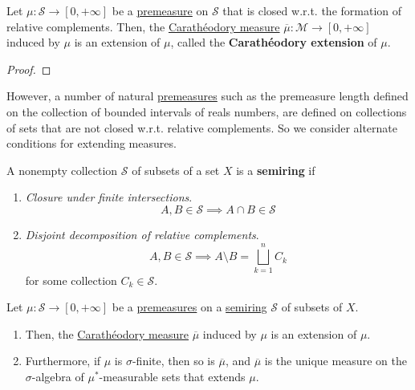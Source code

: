   \begin{theorem}
    \label{thm:premeasure-over-set-closured-under-relative}
    Let $\mu: \mathcal{S} \to [0, +\infty]$ be a \hyperref[def:premeasure]{premeasure} on $\mathcal{S}$ that is closed w.r.t. the formation of relative complements. Then, the \hyperref[def:caratheodory-measure]{Carathéodory measure} $\overline{\mu}: \mathcal{M} \to [0, +\infty]$ induced by $\mu$ is an extension of $\mu$, called the \textbf{Carathéodory extension} of $\mu$. 
  \end{theorem}
  \begin{proof}
    
  \end{proof}

  However, a number of natural \hyperref[def:premeasure]{premeasures} such as the premeasure length defined on the collection of bounded intervals of reals numbers, are defined on collections of sets that are not closed w.r.t. relative complements. So we consider alternate conditions for extending measures. 

  \begin{definition}[Semiring]
    \label{def:semiring}
    A nonempty collection $\mathcal{S}$ of subsets of a set $X$ is a \textbf{semiring} if 
    \begin{enumerate}
      \item \textit{Closure under finite intersections}. 
        \begin{equation}
          A, B \in \mathcal{S} \implies A \cap B \in \mathcal{S}
        \end{equation}
      \item \textit{Disjoint decomposition of relative complements}. 
        \begin{equation}
          A, B \in \mathcal{S} \implies A \setminus B = \bigsqcup_{k=1}^n C_k
        \end{equation}
        for some collection $C_k \in \mathcal{S}$. 
    \end{enumerate}
  \end{definition}

  \begin{theorem}
    \label{thm:caratheodory-hahn-theorem}
    Let $\mu: \mathcal{S} \to [0, +\infty]$ be a \hyperref[def:premeasure]{premeasures} on a \hyperref[def:semiring]{semiring} $\mathcal{S}$ of subsets of $X$. 
    \begin{enumerate}
      \item Then, the \hyperref[def:caratheodory-measure]{Carathéodory measure} $\overline{\mu}$ induced by $\mu$ is an extension of $\mu$. 
      \item Furthermore, if $\mu$ is $\sigma$-finite, then so is $\overline{\mu}$, and $\overline{\mu}$ is the unique measure on the $\sigma$-algebra of $\mu^\ast$-measurable sets that extends $\mu$. 
    \end{enumerate}
  \end{theorem}

